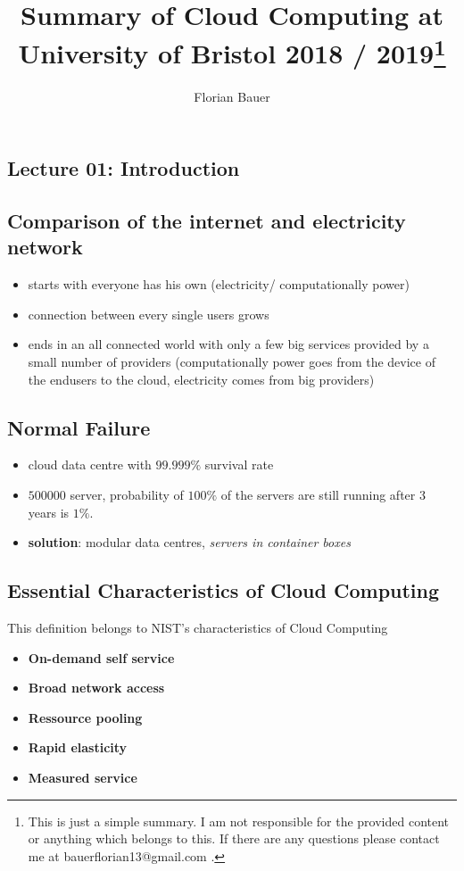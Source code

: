\documentclass[a4paper]{article}
\title{\vspace*{\fill}Summary of Cloud Computing at University of Bristol 2018 / 2019\footnote{This is just a simple summary.
I am not responsible for the provided content or anything which belongs to this. If there are any questions please contact me at
bauerflorian13@gmail.com .}}
\author{Florian Bauer\vspace*{\fill}}
\begin{document}
  \begin{titlepage}
    \clearpage
    \maketitle
    \thispagestyle{empty}
  \end{titlepage}

  \begingroup
    \hypersetup{linkcolor=black}
    \clearpage
    \tableofcontents
    \thispagestyle{empty}
  \endgroup
  \pagebreak

  \setcounter{section}{-1}
  \setcounter{page}{1}
  \begin{multicols}{3}

\section{Lecture 01: Introduction}

\subsection{Comparison of the internet and electricity network}
\begin{itemize}
    \item starts with everyone has his own (electricity/ computationally power)
    \item connection between every single users grows
    \item ends in an all connected world with only a few big services provided by a small number of providers
    (computationally power goes from the device of the endusers to the cloud, electricity comes from big providers) 
\end{itemize}

\subsection{Normal Failure}
\begin{itemize}
    \item cloud data centre with $99.999\%$ survival rate
    \item $500 000$ server, probability of $100\%$ of the servers are still running after 3 years is $1\%$.
    \item \textbf{solution}: modular data centres, \textit{servers in container boxes}
\end{itemize}

\subsection{Essential Characteristics of Cloud Computing}
This definition belongs to NIST's characteristics of Cloud Computing
\begin{itemize}
    \item \textbf{On-demand self service}
    \item \textbf{Broad network access}
    \item \textbf{Ressource pooling}
    \item \textbf{Rapid elasticity}
    \item \textbf{Measured service}
\end{itemize}


\end{multicols}
\end{document}
